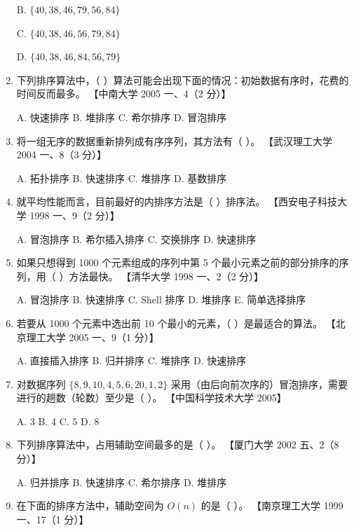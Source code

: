 \documentclass[lang=cn,newtx,10pt,scheme=chinese]{elegantbook}
\begin{document}
\begin{enumerate}
    B. $\{40, 38, 46, 79, 56, 84\}$  

    C. $\{40, 38, 46, 56, 79, 84\}$  

    D. $\{40, 38, 46, 84, 56, 79\}$  

    \item 下列排序算法中，（ ）算法可能会出现下面的情况：初始数据有序时，花费的时间反而最多。  
    【中南大学 2005 一、4（2 分）】  

    A. 快速排序 \quad B. 堆排序 \quad C. 希尔排序 \quad D. 冒泡排序  

    \item 将一组无序的数据重新排列成有序序列，其方法有（ ）。  
    【武汉理工大学 2004 一、8（3 分）】  

    A. 拓扑排序 \quad B. 快速排序 \quad C. 堆排序 \quad D. 基数排序  

    \item 就平均性能而言，目前最好的内排序方法是（ ）排序法。  
    【西安电子科技大学 1998 一、9（2 分）】  

    A. 冒泡排序 \quad B. 希尔插入排序 \quad C. 交换排序 \quad D. 快速排序  

    \item 如果只想得到 1000 个元素组成的序列中第 5 个最小元素之前的部分排序的序列，用（ ）方法最快。  
    【清华大学 1998 一、2（2 分）】 

    A. 冒泡排序 \quad B. 快速排序 \quad C. Shell 排序 \quad D. 堆排序 \quad E. 简单选择排序  

    \item 若要从 1000 个元素中选出前 10 个最小的元素，（ ）是最适合的算法。  
    【北京理工大学 2005 一、9（1 分）】 

    A. 直接插入排序 \quad B. 归并排序 \quad C. 堆排序 \quad D. 快速排序  

    \item 对数据序列 $\{8, 9, 10, 4, 5, 6, 20, 1, 2\}$ 采用（由后向前次序的）冒泡排序，需要进行的趟数（轮数）至少是（ ）。  
    【中国科学技术大学 2005】  

    A. 3 \quad B. 4 \quad C. 5 \quad D. 8  

    \item 下列排序算法中，占用辅助空间最多的是（ ）。  
    【厦门大学 2002 五、2（8 分）】  

    A. 归并排序 \quad B. 快速排序 \quad C. 希尔排序 \quad D. 堆排序  

    \item 在下面的排序方法中，辅助空间为 $O(n)$ 的是（ ）。  
    【南京理工大学 1999 一、17（1 分）】 


\end{enumerate}
\end{document}
